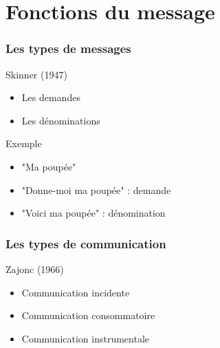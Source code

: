 \section{Fonctions du message}

\begin{frame}
	\frametitle{Les types de messages}
	\begin{block}{Skinner (1947)}
		\begin{itemize}
			\item{Les demandes}
			\item{Les dénominations}
		\end{itemize}
	\end{block} \pause
	
	\begin{exampleblock}{Exemple}
		\begin{itemize}
			\item{"Ma poupée"}
			\item{"Donne-moi ma poupée" : demande}
			\item{"Voici ma poupée" : dénomination}
		\end{itemize}
	\end{exampleblock}
\end{frame}


\begin{frame}
	\frametitle{Les types de communication}
	\begin{block}{Zajonc (1966)}
		\begin{itemize}
			\item{Communication incidente} \pause
			\item{Communication consommatoire} \pause
			\item{Communication instrumentale}
		\end{itemize}
	\end{block}
\end{frame}


